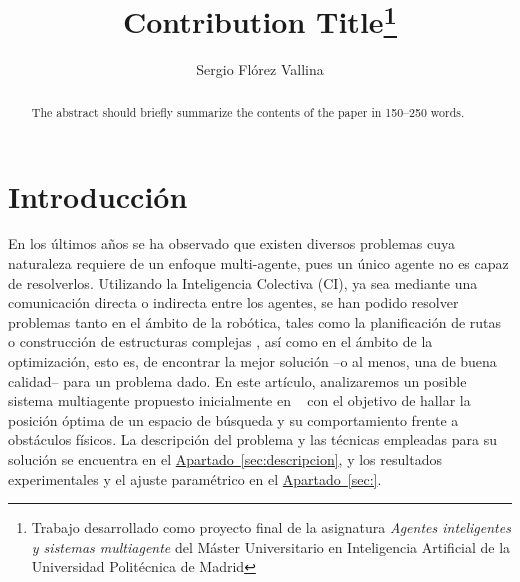 \documentclass[runningheads]{llncs}
\newcommand{\refcruzada}[2]{\hyperref[#2]{#1~\ref{#2}}}
\begin{document}
    \title{Contribution Title\thanks{Trabajo desarrollado como proyecto final de la asignatura \textit{Agentes inteligentes y sistemas multiagente} del Máster Universitario en Inteligencia Artificial de la Universidad Politécnica de Madrid}}
    \author{Sergio Flórez Vallina}

    \maketitle              %
    \begin{abstract}
        The abstract should briefly summarize the contents of the paper in
        150--250 words.

    \end{abstract}

    \section{Introducción}
    En los últimos años se ha observado que existen diversos problemas cuya naturaleza requiere de un enfoque multi-agente, pues un único agente no es capaz de resolverlos.
    Utilizando la Inteligencia Colectiva (CI), ya sea mediante una comunicación directa o indirecta entre los agentes, se han podido resolver problemas tanto en el ámbito de la robótica, tales como la planificación de rutas o construcción de estructuras complejas \cite{collectiveConstruction}, así como en el ámbito de la optimización, esto es, de encontrar la mejor solución --o al menos, una de buena calidad-- para un problema dado.
    En este artículo, analizaremos un posible sistema multiagente propuesto inicialmente en ~\cite{initialPaper}  con el objetivo de hallar la posición óptima de un espacio de búsqueda y su comportamiento frente a obstáculos físicos.
    La descripción del problema y las técnicas empleadas para su solución se encuentra en el \refcruzada{Apartado}{sec:descripcion}, y los resultados experimentales y el ajuste paramétrico en el \refcruzada{Apartado}{sec:}. %
\end{document}

